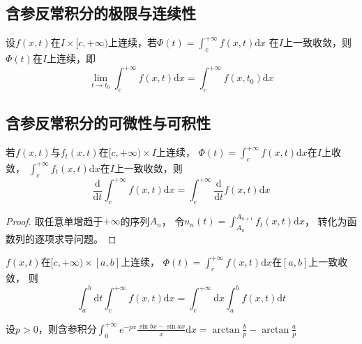 \subsection{含参反常积分的极限与连续性}


\begin{theorem}[连续性]
  设$f(x,t)$在$I \times [c,+\infty)$上连续，若$\Phi(t) = \int_c^{+\infty} f(x,t)\mathrm{d} x$
  在$I$上一致收敛，则$\Phi(t)$在$I$上连续，即
  \begin{equation*}
    \lim \limits _{t \rightarrow t_0} \int_c^{+\infty} f(x,t)\mathrm{d}x = \int_c^{+\infty} f(x,t_0)\mathrm{d} x
  \end{equation*}
\end{theorem}

\subsection{含参反常积分的可微性与可积性}

\begin{theorem}[可微性]
  若$f(x,t)$与$f_t(x,t)$在$[c,+\infty) \times I$上连续，
  $\Phi(t) = \int_c^{+\infty} f(x,t)\mathrm{d} x$在$I$上收敛，
  $\int_c^{+\infty} f_t(x,t)\mathrm{d} x$在$I$上一致收敛，则
  \begin{equation*}
    \frac{\mathrm{d} }{\mathrm{d} t} \int_c^{+\infty}f(x,t)\mathrm{d} x = \int_c^{+\infty} \frac{\mathrm{d}}{\mathrm{d} t}f(x,t)\mathrm{d} x
  \end{equation*}
\end{theorem}

\begin{proof}
  取任意单增趋于$+\infty$的序列$A_n$，
  令$u_n(t) = \int_{A_n}^{A_{n+1}} f_t(x,t)\mathrm{d} x$，
  转化为函数列的逐项求导问题。
\end{proof}

\begin{theorem}[可积性]
  $f(x,t)$在$[c,+\infty) \times [a,b]$上连续，
  $\Phi(t) = \int_c^{+\infty} f(x,t)\mathrm{d} x$在$[a,b]$上一致收敛，
  则
  \begin{equation*}
    \int_a^b \mathrm{d} t \int_c^{+\infty} f(x,t)\mathrm{d} x = \int_c^{+\infty} \mathrm{d} x \int_a^b f(x,t)\mathrm{d} t
  \end{equation*}
\end{theorem}

\begin{theorem}[常用的积分公式]
  设$p > 0$，则含参积分$\int_0^{+\infty} e^{-px} \frac{\sin bx - \sin ax}{x} \mathrm{d} x = \arctan \frac{b}{p} - \arctan \frac{a}{p}$
\end{theorem}

